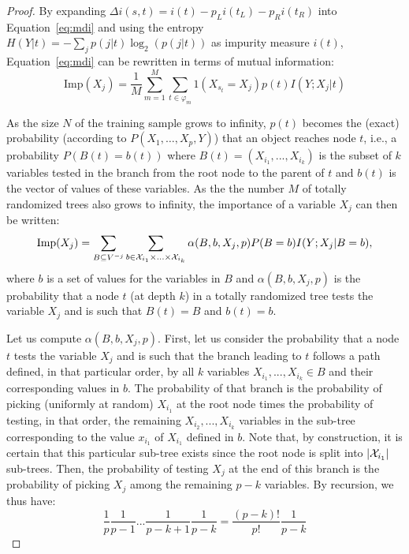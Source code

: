 \begin{proof}
By expanding $\Delta i(s, t) = i(t) - p_L i(t_L) - p_R i(t_R)$ into
Equation~\ref{eq:mdi} and using the entropy $H(Y|t) = -\sum_j p(j|t) \log_2(p(j|t))$
as impurity measure $i(t)$, Equation~\ref{eq:mdi} can be rewritten in terms of
mutual information:
\begin{equation}
\text{Imp}(X_j) = \frac{1}{M} \sum_{m=1}^M \sum_{t \in \varphi_m} 1(X_{s_t} = X_j) p(t) I(Y;X_j|t)
\end{equation}

As the size $N$ of the training sample grows to infinity, $p(t)$ becomes the
(exact) probability (according to $P(X_1,\ldots,X_p,Y)$) that an object reaches
node $t$, i.e., a probability $P(B(t)=b(t))$ where $B(t)=(X_{i_1}, ...,
X_{i_{k}})$ is the subset of $k$ variables tested in the branch from the root
node to the parent of $t$ and $b(t)$ is the vector of values of these
variables. As the the number $M$ of totally randomized trees also grows to
infinity, the importance of a variable $X_j$ can then be written:
\begin{equation}
\text{Imp}(X_j)=\sum_{B\subseteq V^{-j}} \sum_{b\in {\cal X}_{i_1}\times ... \times {\cal X}_{i_{k}} } \alpha(B,b,X_j,p) P(B=b) I(Y;X_j|B=b),
\end{equation}
where $b$ is a set of values for the variables in $B$ and $\alpha(B,b,X_j,p)$ is
the probability that a node $t$ (at depth $k$) in a totally randomized tree
tests the variable $X_j$ and is such that $B(t)=B$ and $b(t)=b$.

Let us compute $\alpha(B,b,X_j,p)$. First, let us consider the probability that
a node $t$ tests the variable $X_j$ and is such that the branch leading to $t$
follows a path defined, in that particular order, by all $k$ variables $X_{i_1},
..., X_{i_{k}} \in B$ and their corresponding values in $b$. The probability of
that branch is the probability of picking (uniformly at random)  $X_{i_1}$  at
the root node times the probability of testing, in that order, the remaining
$X_{i_2}, ..., X_{i_{k}}$ variables in the sub-tree corresponding to the value
$x_{i_1}$ of $X_{i_1}$ defined in $b$. Note that, by construction, it is certain
that this particular sub-tree exists since the root node is split into $|{\cal
X}_{i_1}|$ sub-trees.  Then, the
probability of testing $X_j$ at the end of this branch is the probability of
picking $X_j$ among the remaining $p-k$ variables. By recursion, we thus have:
\begin{equation}
\frac{1}{p} \frac{1}{p-1} ... \frac{1}{p-k+1} \frac{1}{p-k} = \frac{(p-k)!}{p!} \frac{1}{p-k}
\end{equation}


\end{proof}
